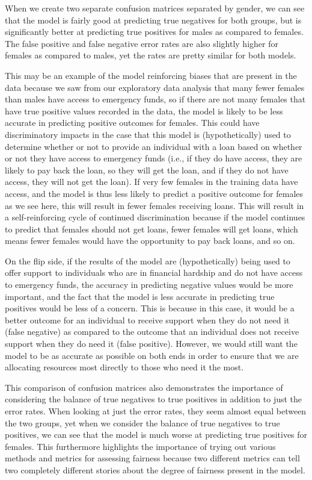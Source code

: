 \documentclass[water,article,submit,moreauthors,pdftex]{mdpi}
\begin{document}
When we create two separate confusion matrices separated by gender, we
can see that the model is fairly good at predicting true negatives for
both groups, but is significantly better at predicting true positives
for males as compared to females. The false positive and false negative
error rates are also slightly higher for females as compared to males,
yet the rates are pretty similar for both models.

This may be an example of the model reinforcing biases that are present
in the data because we saw from our exploratory data analysis that many
fewer females than males have access to emergency funds, so if there are
not many females that have true positive values recorded in the data,
the model is likely to be less accurate in predicting positive outcomes
for females. This could have discriminatory impacts in the case that
this model is (hypothetically) used to determine whether or not to
provide an individual with a loan based on whether or not they have
access to emergency funds (i.e., if they do have access, they are likely
to pay back the loan, so they will get the loan, and if they do not have
access, they will not get the loan). If very few females in the training
data have access, and the model is thus less likely to predict a
positive outcome for females as we see here, this will result in fewer
females receiving loans. This will result in a self-reinforcing cycle of
continued discrimination because if the model continues to predict that
females should not get loans, fewer females will get loans, which means
fewer females would have the opportunity to pay back loans, and so on.

On the flip side, if the results of the model are (hypothetically) being
used to offer support to individuals who are in financial hardship and
do not have access to emergency funds, the accuracy in predicting
negative values would be more important, and the fact that the model is
less accurate in predicting true positives would be less of a concern.
This is because in this case, it would be a better outcome for an
individual to receive support when they do not need it (false negative)
as compared to the outcome that an individual does not receive support
when they do need it (false positive). However, we would still want the
model to be as accurate as possible on both ends in order to ensure that
we are allocating resources most directly to those who need it the most.

This comparison of confusion matrices also demonstrates the importance
of considering the balance of true negatives to true positives in
addition to just the error rates. When looking at just the error rates,
they seem almost equal between the two groups, yet when we consider the
balance of true negatives to true positives, we can see that the model
is much worse at predicting true positives for females. This furthermore
highlights the importance of trying out various methods and metrics for
assessing fairness because two different metrics can tell two completely
different stories about the degree of fairness present in the model.
\end{document}
